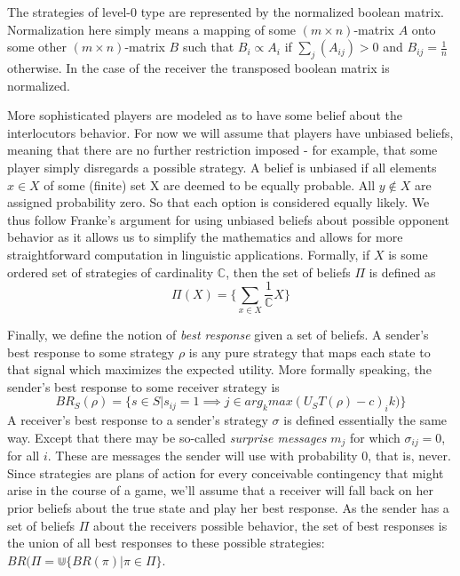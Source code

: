 \documentclass[10]{article}
\begin{document}
The strategies of level-0 type are represented by the normalized boolean matrix. Normalization here simply means a mapping of some $(m\times n)$-matrix $A$ onto some other $(m\times n)$-matrix $B$ such that $B_i\propto A_i$ if $\sum_j (A_{ij})>0$ and $B_{ij}=\tfrac{1}{n}$ otherwise. In the case of the receiver the transposed boolean matrix is normalized.

More sophisticated players are modeled as to have some belief about the interlocutors behavior. For now we will assume that players have unbiased beliefs, meaning that there are no further restriction imposed - for example, that some player simply disregards a possible strategy. A belief is unbiased if all elements $x\in X$ of some (finite) set X are deemed to be equally probable. All $y\not\in X$ are assigned probability zero. So that each option is considered equally likely. We thus follow Franke's argument for 
 using unbiased beliefs about possible opponent behavior as it allows us to simplify the mathematics and allows for more straightforward computation in linguistic applications. Formally, if $X$ is some ordered set of strategies of cardinality $\mathbb{C}$, then the set of beliefs $\Pi$ is defined as\\
\begin{equation*}
\Pi(X)=\{\sum_{x\in X} \dfrac{1}{\mathbb{C}}X\}
\end{equation*} %


Finally, we define the notion of \textit{best response} given a set of beliefs. A sender's best response to some strategy $\rho$ is any pure strategy that maps each state to that signal which maximizes the expected utility. 
More formally speaking, the sender's best response to some receiver strategy is\\
\begin{equation*}
BR_S(\rho)=\{s\in S | s_{ij}=1\implies j \in arg_kmax(U_S T(\rho)-c)_ik)\}
\end{equation*} 
A receiver's best response to a sender's strategy $\sigma$ is defined essentially the same way. Except that there may be so-called \textit{surprise messages} $m_j$ for which $\sigma_{ij}=0$, for all $i$. These are messages the sender will use with probability 0, that is, never. Since strategies are plans of action for every conceivable contingency that might arise in the course of a game, we'll assume that a receiver will fall back on her prior beliefs about the true state and play her best response.
As the sender has a set of beliefs $\Pi$ about the receivers possible behavior, the set of best responses is the union of all best responses to these possible strategies: $BR(\Pi=\Cup\{BR(\pi)|\pi\in\Pi\}$.
\end{document}
